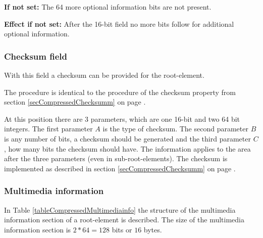 \bigskip\noindent
\textbf{If not set:} The 64 more optional information bits are not present.

\bigskip\noindent
\textbf{Effect if not set:}
After the 16-bit field no more bits follow for additional optional information.


\subsubsection{Checksum field}
\label{secCompressedRootChecksumm}

With this field a checksum can be provided for the root-element.

The procedure is identical to the procedure of the checksum property from section \ref{secCompressedChecksumm} on page \pageref{secCompressedChecksumm}.

At this position there are 3 parameters, which are one 16-bit and two 64 bit integers. The first parameter $A$ is the type of checksum. The second parameter $B$ is any number of bits, a checksum should be generated and the third parameter $C$, how many bits the checksum should have. The information applies to the area after the three parameters (even in sub-root-elements). The checksum is implemented as described in section \ref{secCompressedChecksumm} on page \pageref{secCompressedChecksumm}.


\subsubsection{Multimedia information}
\label{secCompressedMultimediainfo}

In Table \ref{tableCompressedMultimediainfo} the structure of the multimedia information section of a root-element is described.
The size of the  multimedia information section is $2 * 64 = 128$ bits or $16$ bytes.

